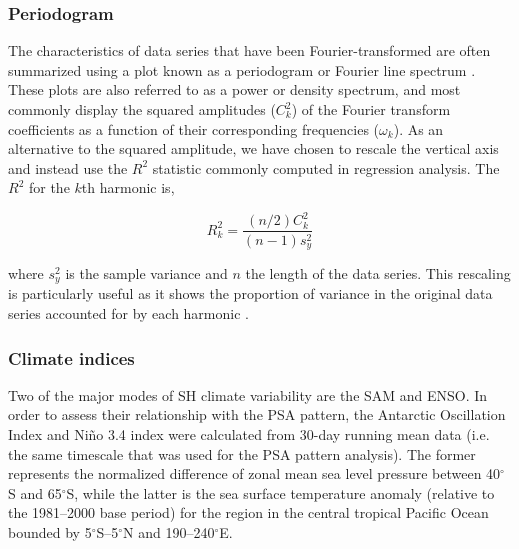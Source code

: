 \subsubsection{Periodogram}

The characteristics of data series that have been Fourier-transformed are often summarized using a plot known as a periodogram or Fourier line spectrum \citep{Wilks2011}. These plots are also referred to as a power or density spectrum, and most commonly display the squared amplitudes ($C_k^2$) of the Fourier transform coefficients as a function of their corresponding frequencies ($\omega_k$). As an alternative to the squared amplitude, we have chosen to rescale the vertical axis and instead use the $R^2$ statistic commonly computed in regression analysis. The $R^2$ for the $k$th harmonic is,

\begin{equation}\label{eq:variance_explained}
R_k^2 = \frac{(n/2)C_k^2}{(n-1)s_y^2}
\end{equation}

\noindent where $s_y^2$ is the sample variance and $n$ the length of the data series. This rescaling is particularly useful as it shows the proportion of variance in the original data series accounted for by each harmonic \citep{Wilks2011}.

\subsubsection{Climate indices}
Two of the major modes of SH climate variability are the SAM and ENSO. In order to assess their relationship with the PSA pattern, the Antarctic Oscillation Index \citep{Gong1999} and Ni\~{n}o 3.4 index \citep{Trenberth2001} were calculated from 30-day running mean data (i.e. the same timescale that was used for the PSA pattern analysis). The former represents the normalized difference of zonal mean sea level pressure between 40$^{\circ}$S and 65$^{\circ}$S, while the latter is the sea surface temperature anomaly (relative to the 1981--2000 base period) for the region in the central tropical Pacific Ocean bounded by 5$^{\circ}$S--5$^{\circ}$N and 190--240$^{\circ}$E. 

